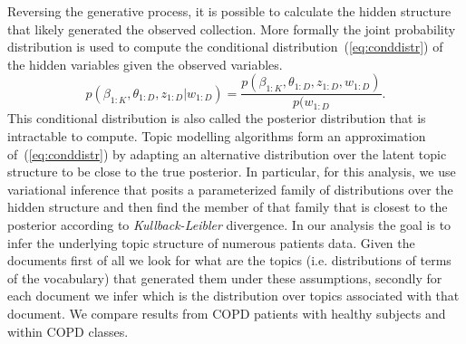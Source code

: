 Reversing the generative process, it is possible to calculate the hidden structure that likely generated the observed collection. More formally the joint probability distribution is used to compute the conditional distribution~(\ref{eq:conddistr}) of the hidden variables given the observed variables. 
\begin{dmath}
  p(\beta_{1:K},\theta_{1:D},z_{1:D}|w_{1:D}) =   \frac{p(\beta_{1:K},\theta_{1:D},z_{1:D},w_{1:D})}{p(w_{1:D}}.
  \label{eq:conddistr}
\end{dmath}
This conditional distribution is also called the posterior distribution that is intractable to compute. Topic modelling algorithms form an approximation of~(\ref{eq:conddistr}) by adapting an alternative distribution over the latent topic structure to be close to the true posterior. In particular, for this analysis, we use variational inference that posits a parameterized family of distributions over the hidden structure and then find the member of that family that is closest to the posterior according to \emph{Kullback-Leibler} divergence.
In our analysis the goal is to infer the underlying topic structure of numerous patients data.
Given the documents first of all we look for what are the topics (i.e. distributions of terms of the vocabulary) that generated them under these assumptions, secondly for each document we infer which is the distribution over topics associated with that document. We compare results from COPD patients with healthy subjects and within COPD classes.








